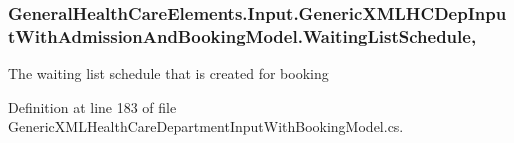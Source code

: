 \subsubsection[{\texorpdfstring{Waiting\+List\+Schedule}{WaitingListSchedule}}]{ General\+Health\+Care\+Elements.\+Input.\+Generic\+X\+M\+L\+H\+C\+Dep\+Input\+With\+Admission\+And\+Booking\+Model.\+Waiting\+List\+Schedule\hspace{0.3cm}{\ttfamily [get]}, {\ttfamily [set]}}\hypertarget{class_general_health_care_elements_1_1_input_1_1_generic_x_m_l_h_c_dep_input_with_admission_and_booking_model_aff02044e306bfcd1954913df623a2142}{}\label{class_general_health_care_elements_1_1_input_1_1_generic_x_m_l_h_c_dep_input_with_admission_and_booking_model_aff02044e306bfcd1954913df623a2142}


The waiting list schedule that is created for booking 



Definition at line 183 of file Generic\+X\+M\+L\+Health\+Care\+Department\+Input\+With\+Booking\+Model.\+cs.

